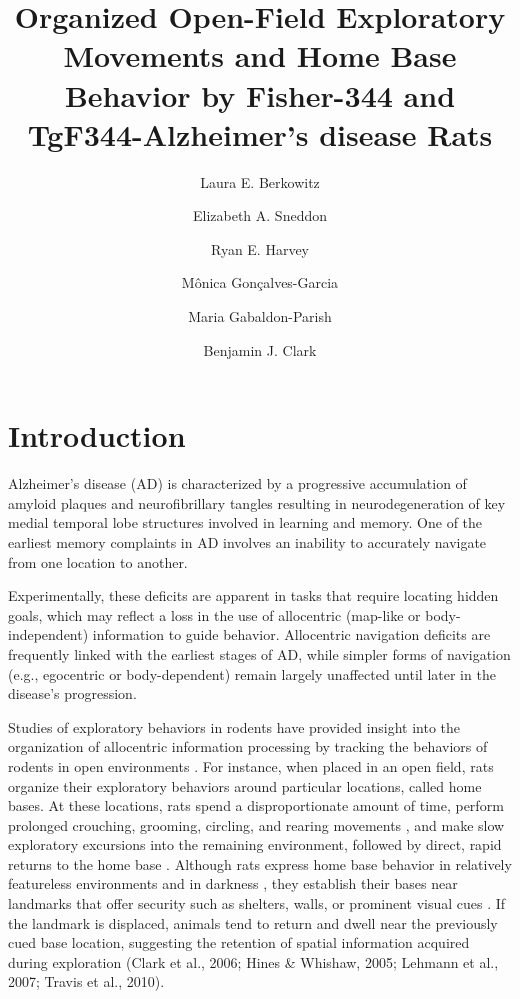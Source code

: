 \documentclass[fleqn,10pt]{wlscirep}
\title{Organized Open-Field Exploratory Movements and Home Base Behavior by Fisher-344 and TgF344-Alzheimer’s disease Rats}
\author[1]{Laura E. Berkowitz}
\author[1]{Elizabeth A. Sneddon}
\author[1]{Ryan E. Harvey}
\author[1]{M\^{o}nica Gon\c{c}alves-Garcia}
\author[1]{Maria Gabaldon-Parish}
\author[1,*]{Benjamin J. Clark}
\affil[1]{University of New Mexico, Psychology, Albuquerque, NM 87131, United States}
\affil[*]{bnjclark@unm.edu}
\begin{document}
\flushbottom
\maketitle
%
%
\thispagestyle{empty}

\section*{Introduction}

Alzheimer’s disease (AD) is characterized by a progressive accumulation of amyloid plaques and neurofibrillary tangles resulting in neurodegeneration of key medial temporal lobe structures involved in learning and memory. One of the earliest memory complaints in AD involves an inability to accurately navigate from one location to another. 

Experimentally, these deficits are apparent in tasks that require locating hidden goals, which may reflect a loss in the use of allocentric (map-like or body-independent) information to guide behavior. Allocentric navigation deficits are frequently linked with the earliest stages of AD, while simpler forms of navigation (e.g., egocentric or body-dependent) remain largely unaffected until later in the disease's progression.

Studies of exploratory behaviors in rodents have provided insight into the organization of allocentric information processing by tracking the behaviors of rodents in open environments \cite{dudchenko_neuroethology_2018,poulter_neurobiology_2018,thompson_behavioral_2018}. For instance, when placed in an open field, rats organize their exploratory behaviors around particular locations, called home bases. At these locations, rats spend a disproportionate amount of time, perform prolonged crouching, grooming, circling, and rearing movements \cite{eilam_home_1989}, and make slow exploratory excursions into the remaining environment, followed by direct, rapid returns to the home base \cite{wallace_nmda_2003}. Although rats express home base behavior in relatively featureless environments and in darkness \cite{eilam_home_1989,hines_home_2005,nemati_point_2007}, they establish their bases near landmarks that offer security such as shelters, walls, or prominent visual cues \cite{clark_impaired_2005,hines_home_2005,lehmann_complete_2007,wallace_nmda_2003,whishaw_exploratory_2006}. If the landmark is displaced, animals tend to return and dwell near the previously cued base location, suggesting the retention of spatial information acquired during exploration \cite{clark_impaired_2005,hines_home_2005,lehmann_complete_2007}(Clark et al., 2006; Hines \& Whishaw, 2005; Lehmann et al., 2007; Travis et al., 2010). 
\end{document}

